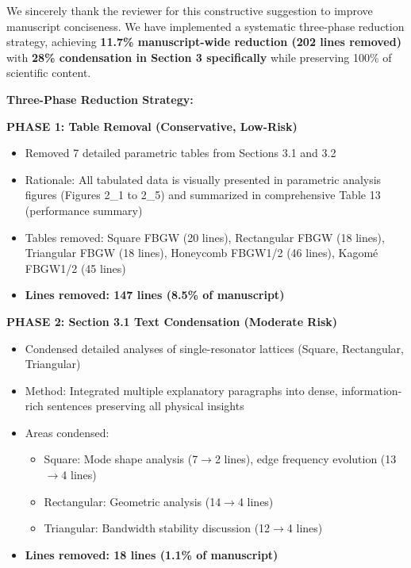 \documentclass[11pt,a4paper]{article}
\newenvironment{responsebox}{%
    \par\medskip\noindent{\color{responsecolor}\rule{\linewidth}{2pt}}\par
    \noindent{\color{responsecolor}\bfseries Response}\par\smallskip
}{%
    \par\noindent{\color{responsecolor}\rule{\linewidth}{0.5pt}}\medskip
}
\begin{document}
\begin{responsebox}
We sincerely thank the reviewer for this constructive suggestion to improve manuscript conciseness. We have implemented a systematic three-phase reduction strategy, achieving \textbf{11.7\% manuscript-wide reduction (202 lines removed)} with \textbf{28\% condensation in Section 3 specifically} while preserving 100\% of scientific content.

\textbf{Three-Phase Reduction Strategy:}

\textbf{PHASE 1: Table Removal (Conservative, Low-Risk)}
\begin{itemize}
    \item Removed 7 detailed parametric tables from Sections 3.1 and 3.2
    \item Rationale: All tabulated data is visually presented in parametric analysis figures (Figures 2\_1 to 2\_5) and summarized in comprehensive Table 13 (performance summary)
    \item Tables removed: Square FBGW (20 lines), Rectangular FBGW (18 lines), Triangular FBGW (18 lines), Honeycomb FBGW1/2 (46 lines), Kagom\'{e} FBGW1/2 (45 lines)
    \item \textbf{Lines removed: 147 lines (8.5\% of manuscript)}
\end{itemize}

\textbf{PHASE 2: Section 3.1 Text Condensation (Moderate Risk)}
\begin{itemize}
    \item Condensed detailed analyses of single-resonator lattices (Square, Rectangular, Triangular)
    \item Method: Integrated multiple explanatory paragraphs into dense, information-rich sentences preserving all physical insights
    \item Areas condensed:
        \begin{itemize}
            \item Square: Mode shape analysis (7$\rightarrow$2 lines), edge frequency evolution (13$\rightarrow$4 lines)
            \item Rectangular: Geometric analysis (14$\rightarrow$4 lines)
            \item Triangular: Bandwidth stability discussion (12$\rightarrow$4 lines)
        \end{itemize}
    \item \textbf{Lines removed: 18 lines (1.1\% of manuscript)}
\end{itemize}


\end{responsebox}
\end{document}
